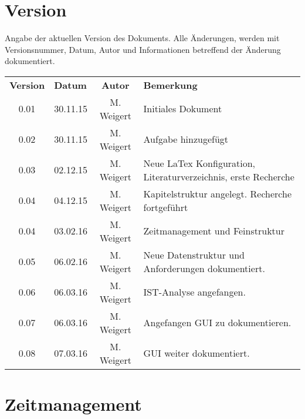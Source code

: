 \chapter*{Version}

Angabe der aktuellen Version des Dokuments. Alle Änderungen, werden mit Versionsnummer, Datum, Autor und Informationen betreffend der Änderung dokumentiert.\\

\begin{tabular}{|c|l|c|l|}
	\rowcolor{black} {\color{white}\textbf{Version}} & {\color{white}\textbf{Datum}} & {\color{white}\textbf{Autor}} & {\color{white}\textbf{Bemerkung}} \\
	0.01 & 30.11.15 & M. Weigert & Initiales Dokument \\ \hline
	\rowcolor{DarkSeaGreen} 0.02 & 30.11.15 & M. Weigert & Aufgabe hinzugefügt \\ \hline
	0.03 & 02.12.15 & M. Weigert & Neue LaTex Konfiguration, Literaturverzeichnis, erste Recherche \\ \hline
	\rowcolor{DarkSeaGreen} 0.04 & 04.12.15 & M. Weigert & Kapitelstruktur angelegt. Recherche fortgeführt \\ \hline
	0.04 & 03.02.16 & M. Weigert & Zeitmanagement und Feinstruktur \\ \hline
	\rowcolor{DarkSeaGreen} 0.05 & 06.02.16 & M. Weigert & Neue Datenstruktur und Anforderungen dokumentiert. \\ \hline
	0.06 & 06.03.16 & M. Weigert & IST-Analyse angefangen. \\ \hline
	\rowcolor{DarkSeaGreen} 0.07 & 06.03.16 & M. Weigert & Angefangen GUI zu dokumentieren. \\ \hline
	0.08 & 07.03.16 & M. Weigert & GUI weiter dokumentiert. \\ \hline
\end{tabular}

\chapter*{Zeitmanagement}

